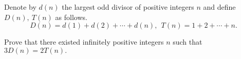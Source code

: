 Denote by $d(n)$ the largest odd divisor of positive integers $n$ and define $D(n),\ T(n)$ as follows.\[ D(n)=d(1)+d(2)+\cdots +d(n),\ \ T(n)=1+2+\cdots +n.  \]

Prove that there existed infinitely positive integers $n$ such that $3D(n)=2T(n).$